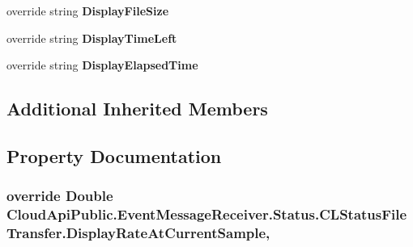 \begin{DoxyCompactItemize}
\item 
\hypertarget{class_cloud_api_public_1_1_event_message_receiver_1_1_status_1_1_c_l_status_file_transfer_a3942ab2a8a2a610f0831926f40ed95b1}{override string {\bfseries Display\-File\-Size}}\label{class_cloud_api_public_1_1_event_message_receiver_1_1_status_1_1_c_l_status_file_transfer_a3942ab2a8a2a610f0831926f40ed95b1}

\item 
\hypertarget{class_cloud_api_public_1_1_event_message_receiver_1_1_status_1_1_c_l_status_file_transfer_afd827decd80b097a7f945db31b5b9437}{override string {\bfseries Display\-Time\-Left}}\label{class_cloud_api_public_1_1_event_message_receiver_1_1_status_1_1_c_l_status_file_transfer_afd827decd80b097a7f945db31b5b9437}

\item 
\hypertarget{class_cloud_api_public_1_1_event_message_receiver_1_1_status_1_1_c_l_status_file_transfer_a771afeecaa1f4c0b7a9eb56ad5e4c84c}{override string {\bfseries Display\-Elapsed\-Time}}\label{class_cloud_api_public_1_1_event_message_receiver_1_1_status_1_1_c_l_status_file_transfer_a771afeecaa1f4c0b7a9eb56ad5e4c84c}

\end{DoxyCompactItemize}
\subsection*{Additional Inherited Members}


\subsection{Property Documentation}
\hypertarget{class_cloud_api_public_1_1_event_message_receiver_1_1_status_1_1_c_l_status_file_transfer_a16f8a7d7676dc5dff1d75289a244bf71}{
\subsubsection[{Display\-Rate\-At\-Current\-Sample}]{\setlength{\rightskip}{0pt plus 5cm}override Double Cloud\-Api\-Public.\-Event\-Message\-Receiver.\-Status.\-C\-L\-Status\-File\-Transfer.\-Display\-Rate\-At\-Current\-Sample\hspace{0.3cm}{\ttfamily [get]}, {\ttfamily [set]}}}\label{class_cloud_api_public_1_1_event_message_receiver_1_1_status_1_1_c_l_status_file_transfer_a16f8a7d7676dc5dff1d75289a244bf71}


